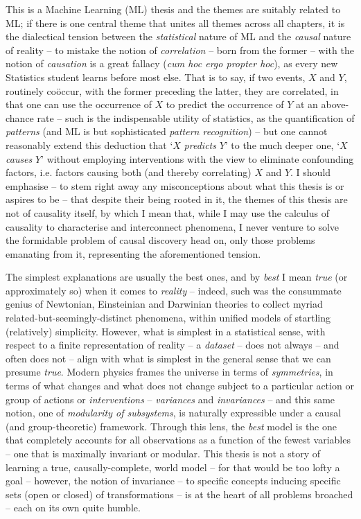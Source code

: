 %
This is a Machine Learning (ML) thesis and the themes are suitably related to ML; if there
is one central theme that unites all themes across all chapters, it is the dialectical tension
between the \emph{statistical} nature of ML and the \emph{causal} nature of reality -- to mistake
the notion of \emph{correlation} -- born from the former -- with the notion of \emph{causation} is
a great fallacy (\emph{cum hoc ergo propter hoc}), as every new Statistics student learns before
most else.
%
That is to say, if two events, \(X\) and \(Y\), routinely co{\"o}ccur, with the former preceding
the latter, they are correlated, in that one can use the occurrence of \(X\) to predict the
occurrence of \(Y\) at an above-chance rate -- such is the indispensable utility of statistics, as
the quantification of \emph{patterns} (and ML is but sophisticated \emph{pattern recognition}) --
but one cannot reasonably extend this deduction that `\(X\) \emph{predicts} \(Y\)' to the much
deeper one, `\(X\) \emph{causes} \(Y\)' without employing interventions with the view to eliminate
confounding factors, i.e. factors causing both (and thereby correlating) \(X\) and \(Y\).
%
I should emphasise -- to stem right away any misconceptions about what this thesis is or aspires to
be -- that despite their being rooted in it, the themes of this thesis are not of causality itself,
by which I mean that, while I may use the calculus of causality to characterise and interconnect
phenomena, I never venture to solve the formidable problem of causal discovery head on, only those
problems emanating from it, representing the aforementioned tension.
%

The simplest explanations are usually the best ones, and by \emph{best} I mean \emph{true} (or
approximately so) when it comes to \emph{reality} -- indeed, such was the consummate genius of
Newtonian, Einsteinian and Darwinian theories to collect myriad related-but-seemingly-distinct
phenomena, within unified models of startling (relatively) simplicity.
%
However, what is simplest in a statistical sense, with respect to a finite representation of
reality -- a \emph{dataset} -- does not always -- and often does not -- align with what is simplest
in the general sense that we can presume \emph{true}.
%
Modern physics frames the universe in terms of \emph{symmetries}, in terms of what changes and what
does not change subject to a particular action or group of actions or \emph{interventions} --
\emph{variances} and \emph{invariances} -- and this same notion, one of \emph{modularity of
subsystems}, is naturally expressible under a causal (and group-theoretic) framework.
%
Through this lens, the \emph{best} model is the one that completely accounts for all observations
as a function of the fewest variables -- one that is maximally invariant or modular.
%
This thesis is not a story of learning a true, causally-complete, world model -- for that would be
too lofty a goal -- however, the notion of invariance -- to specific concepts inducing specific
sets (open or closed) of transformations -- is at the heart of all problems broached -- each on its
own quite humble.

